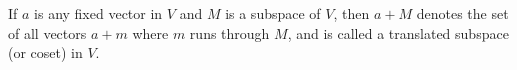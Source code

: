 If $a$ is any fixed vector in $V$ and $M$ is a subspace of $V$, then $a + M$ denotes the set of all vectors $a + m$ where $m$ runs through $M$, and is called a translated subspace (or coset) in $V$.
